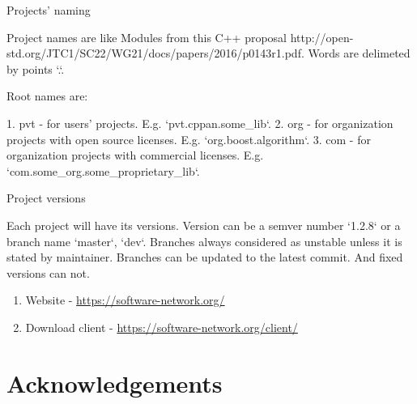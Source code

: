 Projects' naming

Project names are like Modules from this C++ proposal http://open-std.org/JTC1/SC22/WG21/docs/papers/2016/p0143r1.pdf. Words are delimeted by points `.`.

Root names are:

1. pvt - for users' projects. E.g. `pvt.cppan.some_lib`.
2. org - for organization projects with open source licenses. E.g. `org.boost.algorithm`.
3. com - for organization projects with commercial licenses. E.g. `com.some_org.some_proprietary_lib`.

Project versions

Each project will have its versions. Version can be a semver number `1.2.8` or a branch name `master`, `dev`. Branches always considered as unstable unless it is stated by maintainer. Branches can be updated to the latest commit. And fixed versions can not.





\begin{enumerate}
\item
Website - \url{https://software-network.org/}

\item
Download client - \url{https://software-network.org/client/}
\end{enumerate}


\section*{Acknowledgements}

\undef\sectionToc
